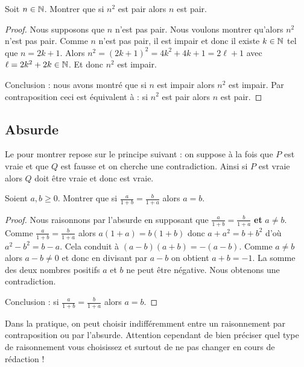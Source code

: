 \documentclass[11pt,class=report,crop=false]{standalone}
\begin{document}
\begin{exemple}
Soit $n \in \mathbb{N}$. Montrer que si $n^2$ est pair alors $n$ est pair.

\begin{proof}
Nous supposons que $n$ n'est pas pair. Nous voulons montrer qu'alors $n^2$ n'est pas pair.
Comme $n$ n'est pas pair, il est impair et donc il existe $k\in \mathbb{N}$ tel que
$n=2k+1$. Alors
$n^2 = (2k+1)^2 = 4k^2 + 4k + 1 = 2\ell+1$ avec $\ell = 2k^2+2k \in \mathbb{N}$.
Et donc $n^2$ est impair.

Conclusion : nous avons montré que si $n$ est impair alors $n^2$ est impair. Par contraposition
ceci est équivalent à : si $n^2$ est pair alors $n$ est pair.
\end{proof}
\end{exemple}



\subsection{Absurde}

Le  pour montrer   repose sur le principe suivant :
on suppose à la fois que $P$ est vraie et que $Q$ est fausse et on cherche une contradiction.
Ainsi si $P$ est vraie alors $Q$ doit être vraie et donc  est vraie.

\begin{exemple}
Soient $a,b \ge 0$. Montrer que si $\frac{a}{1+b}=\frac{b}{1+a}$
alors $a=b$.

\begin{proof}
Nous raisonnons par l'absurde en supposant que  $\frac{a}{1+b}=\frac{b}{1+a}$ \textbf{et}
$a \neq b$.
Comme $\frac{a}{1+b}=\frac{b}{1+a}$ alors $a(1+a)=b(1+b)$ donc
$a+a^2=b+b^2$ d'où $a^2-b^2 = b-a$.
Cela conduit à $(a-b)(a+b)= -(a-b)$. Comme $a\neq b$ alors $a-b\neq 0$ et donc en divisant
par $a-b$ on obtient $a+b=-1$. La somme des deux nombres positifs $a$ et $b$ ne peut être négative.
Nous obtenons une contradiction.

Conclusion : si $\frac{a}{1+b}=\frac{b}{1+a}$ alors $a=b$.
\end{proof}
\end{exemple}

Dans la pratique, on peut choisir indifféremment entre un raisonnement par contraposition ou par l'absurde.
Attention cependant de bien préciser quel type de raisonnement vous choisissez et surtout de ne pas changer
en cours de rédaction !
\end{document}
